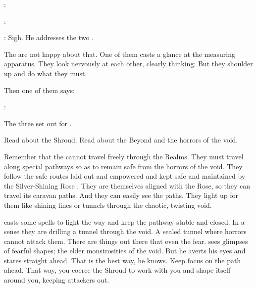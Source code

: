 \Teshrial:

\Teshrial:

\Ganethed:
Sigh. 
He addresses the two \bezedeth.

The \bezedeth are not happy about that.
One of them casts a glance at the measuring apparatus. 
They look nervously at each other, clearly thinking:
But they shoulder up and do what they must. 

Then one of them says:

\Ganethed:



\begin{comment}
  \section{Travelling to \Malcur}
\end{comment}
\new
The three \resphain set out for \Malcur.

Read about the Shroud.
Read about the Beyond and the horrors of the void. 

Remember that the \resphain cannot travel freely through the Realms.
They must travel along special pathways so as to remain safe from the horrors of the void. 
They follow the safe  routes laid out and empowered and kept safe and maintained by the Silver-Shining Rose \matrix. 
They are themselves aligned with the Rose, so they can travel its caravan paths. 
And they can easily see the paths.
They light up for them like shining lines or tunnels through the chaotic, twisting void.

\Teshrial casts some spells to light the way and keep the pathway stable and closed.
In a sense they are drilling a tunnel through the void.
A sealed tunnel where horrors cannot attack them. 
There are things out there that even the \resphain fear. 
\Teshrial sees glimpses of fearful shapes; the elder monstrosities of the void. 
But he averts his eyes and stares straight ahead. 
That is the best way, he knows. 
Keep focus on the path ahead.
That way, you coerce the Shroud to work with you and shape itself around you, keeping attackers out. 

